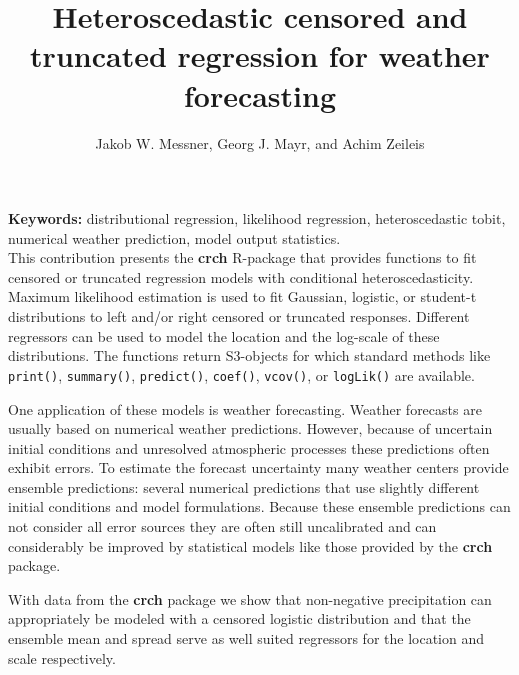 \documentclass{article}
\title{Heteroscedastic censored and truncated regression for weather forecasting}
\author{Jakob W. Messner, Georg J. Mayr, and Achim Zeileis}
\begin{document}
\maketitle

\textbf{Keywords:} distributional regression, likelihood regression, heteroscedastic tobit, numerical weather prediction, model output statistics.\\

This contribution presents the \textbf{crch} \textsf{R}-package that provides functions to fit censored or truncated regression models with conditional heteroscedasticity. Maximum likelihood estimation is used to fit Gaussian, logistic, or student-t distributions to left and/or right censored or truncated responses. Different regressors can be used to model the location and the log-scale of these distributions. The functions return S3-objects for which standard methods like \texttt{print()}, \texttt{summary()}, \texttt{predict()}, \texttt{coef()}, \texttt{vcov()}, or \texttt{logLik()} are available.

One application of these models is weather forecasting. Weather forecasts are usually based on numerical weather predictions. However, because of uncertain initial conditions and unresolved atmospheric processes these predictions often exhibit errors. To estimate the forecast uncertainty many weather centers provide ensemble predictions: several numerical predictions that use slightly different initial conditions and model formulations. Because these ensemble predictions can not consider all error sources they are often still uncalibrated and can considerably be improved by statistical models like those provided by the \textbf{crch} package. 

With data from the \textbf{crch} package we show that non-negative precipitation can appropriately be modeled with a censored logistic distribution and that the ensemble mean and spread serve as well suited regressors for the location and scale respectively.
\end{document}
